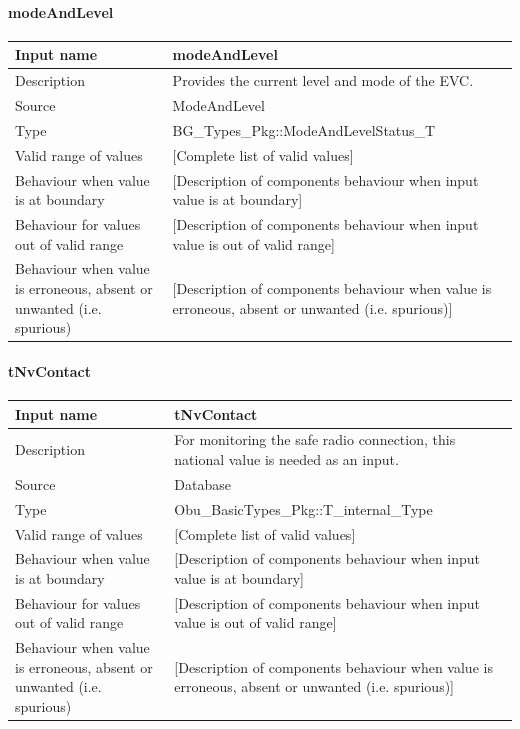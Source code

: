 \paragraph{modeAndLevel}

\begin{longtable}{p{}p{}}
\toprule
Input name				& modeAndLevel \\
\midrule
Description				& Provides the current level and mode of the EVC. \\
\midrule
Source					& ModeAndLevel \\ 
\midrule
Type					& BG\_Types\_Pkg::ModeAndLevelStatus\_T \\
\midrule
Valid range of values	& [Complete list of valid values] \\
\midrule
Behaviour when value is at boundary	& [Description of components behaviour when input value is at boundary] \\
\midrule
Behaviour for values out of valid range	& [Description of components behaviour when input value is out of valid range] \\
\midrule
Behaviour when value is erroneous, absent or unwanted (i.e. spurious) & [Description of components behaviour when value is erroneous, absent or unwanted (i.e. spurious)] \\
\bottomrule
\end{longtable}


\paragraph{tNvContact}

\begin{longtable}{p{}p{}}
\toprule
Input name				& tNvContact \\
\midrule
Description				& For monitoring the safe radio connection, this national value is needed as an input. \\
\midrule
Source					& Database \\ 
\midrule
Type					& Obu\_BasicTypes\_Pkg::T\_internal\_Type \\
\midrule
Valid range of values	& [Complete list of valid values] \\
\midrule
Behaviour when value is at boundary	& [Description of components behaviour when input value is at boundary] \\
\midrule
Behaviour for values out of valid range	& [Description of components behaviour when input value is out of valid range] \\
\midrule
Behaviour when value is erroneous, absent or unwanted (i.e. spurious) & [Description of components behaviour when value is erroneous, absent or unwanted (i.e. spurious)] \\
\bottomrule
\end{longtable}


